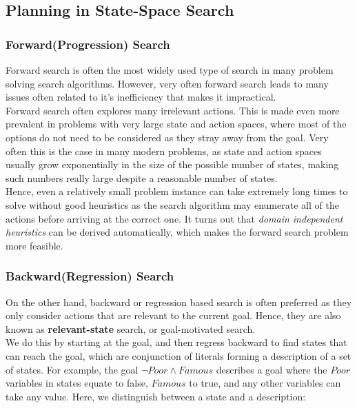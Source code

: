 \documentclass[11pt]{article}
\begin{document}
\subsection{Planning in State-Space Search}

\subsubsection{Forward(Progression) Search}

Forward search is often the most widely used type of search in many problem solving search algorithms. However, very often forward search leads to many issues often related to it's inefficiency that makes it impractical.\\

Forward search often explores many irrelevant actions. This is made even more prevalent in problems with very large state and action spaces, where most of the options do not need to be considered as they stray away from the goal. Very often this is the case in many modern problems, as state and action spaces usually grow exponentially in the size of the possible number of states, making such numbers really large despite a reasonable number of states.\\

Hence, even a relatively small problem instance can take extremely long times to solve without good heuristics as the search algorithm may enumerate all of the actions before arriving at the correct one. It turns out that \textit{domain independent heuristics} can be derived automatically, which makes the forward search problem more feasible.

\subsubsection{Backward(Regression) Search}

On the other hand, backward or regression based search is often preferred as they only consider actions that are relevant to the current goal. Hence, they are also known as \textbf{relevant-state} search, or goal-motivated search.\\

We do this by starting at the goal, and then regress backward to find states that can reach the goal, which are conjunction of literals forming a description of a set of states. For example, the goal $\lnot Poor \land Famous$ describes a goal where the $Poor$ variables in states equate to false, $Famous$ to true, and any other variables can take any value. Here, we distinguish between a state and a description:
\end{document}
